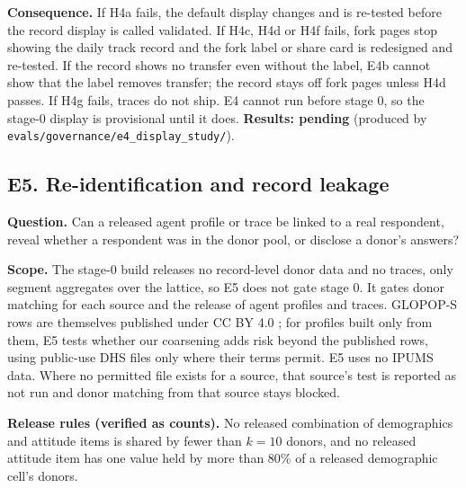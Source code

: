 \documentclass[11pt]{article}
\newcommand{\pending}[1]{\textbf{Results: pending} (produced by \nolinkurl{#1}).}
\begin{document}
\textbf{Consequence.} If H4a fails, the default display changes and is re-tested before the record display is called validated. If H4c, H4d or H4f fails, fork pages stop showing the daily track record and the fork label or share card is redesigned and re-tested. If the record shows no transfer even without the label, E4b cannot show that the label removes transfer; the record stays off fork pages unless H4d passes. If H4g fails, traces do not ship. E4 cannot run before stage 0, so the stage-0 display is provisional until it does.
\pending{evals/governance/e4_display_study/}

\subsection{E5. Re-identification and record leakage}
\textbf{Question.} Can a released agent profile or trace be linked to a real respondent, reveal whether a respondent was in the donor pool, or disclose a donor's answers?

\textbf{Scope.} The stage-0 build releases no record-level donor data and no traces, only segment aggregates over the lattice, so E5 does not gate stage 0. It gates donor matching for each source and the release of agent profiles and traces. GLOPOP-S rows are themselves published under CC BY 4.0 \citep{glopopdataverse}; for profiles built only from them, E5 tests whether our coarsening adds risk beyond the published rows, using public-use DHS files only where their terms permit. E5 uses no IPUMS data. Where no permitted file exists for a source, that source's test is reported as not run and donor matching from that source stays blocked.

\textbf{Release rules (verified as counts).} No released combination of demographics and attitude items is shared by fewer than $k=10$ donors, and no released attitude item has one value held by more than 80\% of a released demographic cell's donors.
\end{document}
